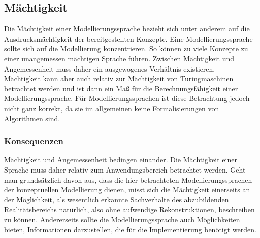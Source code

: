 \subsection{Mächtigkeit}
Die Mächtigkeit einer Modellierungssprache bezieht sich unter anderem auf die Ausdrucksmächtigkeit
der bereitgestellten Konzepte. Eine Modellierungssprache sollte sich auf die Modellierung konzentrieren.
So können zu viele Konzepte zu einer unangemessen mächtigen Sprache führen. Zwischen Mächtigkeit
und Angemessenheit muss daher ein ausgewogenes Verhältnis existieren.\\
Mächtigkeit kann aber auch relativ zur Mächtigkeit von Turingmaschinen betrachtet werden und ist
dann ein Maß für die Berechnungsfähigkeit einer Modellierungssprache. Für Modellierungssprachen
ist diese Betrachtung jedoch nicht ganz korrekt, da sie im allgemeinen keine Formalisierungen von
Algorithmen sind.
\subsubsection{Konsequenzen}
Mächtigkeit und Angemessenheit bedingen einander. Die Mächtigkeit einer Sprache muss daher relativ
zum Anwendungsbereich betrachtet werden. Geht man grundsätzlich davon aus, dass die hier betrachteten
Modellierungssprachen der konzeptuellen Modellierung dienen, misst sich die Mächtigkeit einerseits
an der Möglichkeit, als wesentlich erkannte Sachverhalte des abzubildenden Realitätsbereichs
natürlich, also ohne aufwendige Rekonstruktionen, beschreiben zu können. Andererseits sollte die
Modellierungssprache auch Möglichkeiten bieten, Informationen darzustellen, die für die Implementierung
benötigt werden.



